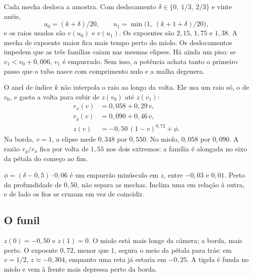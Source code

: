 \documentclass[11pt,a4paper]{article}
\begin{document}
Cada mecha desloca a amostra. Com deslocamento \(\delta \in \{0,\ 1/3,\ 2/3\}\) e vinte anéis,
\[
  u_0 = (k + \delta)/20, \qquad u_1 = \min\big(1,\ (k + 1 + \delta)/20\big),
\]
e os raios usados são \(v(u_0)\) e \(v(u_1)\). Os expoentes são \(2{,}15\), \(1{,}75\) e \(1{,}38\). A mecha de expoente maior fica mais tempo perto do miolo. Os deslocamentos impedem que as três famílias caiam nas mesmas elipses. Há ainda um piso: se \(v_1 < v_0 + 0{,}006\), \(v_1\) é empurrado. Sem isso, a potência achata tanto o primeiro passo que o tubo nasce com comprimento nulo e a malha degenera.

O anel de índice \(k\) não interpola o raio ao longo da volta. Ele usa um raio só, o de \(v_0\), e gasta a volta para subir de \(z(v_0)\) até \(z(v_1)\):
\begin{equation}
\begin{aligned}
r_x(v) &= 0{,}058 + 0{,}29\, v,\\
r_y(v) &= 0{,}090 + 0{,}46\, v,\\
z(v) &= -0{,}50\,(1 - v)^{0{,}72} + \phi .
\end{aligned}
\label{eq:raio}
\end{equation}
Na borda, \(v = 1\), a elipse mede \(0{,}348\) por \(0{,}550\). No miolo, \(0{,}058\) por \(0{,}090\). A razão \(r_y/r_x\) fica por volta de \(1{,}55\) nos dois extremos: a família é alongada no eixo da pétala do começo ao fim.

\(\phi = (\delta - 0{,}5)\cdot 0{,}06\) é um empurrão minúsculo em \(z\), entre \(-0{,}03\) e \(0{,}01\). Perto da profundidade de \(0{,}50\), não separa as mechas. Inclina uma em relação à outra, e de lado os fios se cruzam em vez de coincidir.

\subsection{O funil}

\(z(0) = -0{,}50\) e \(z(1) = 0\). O miolo está mais longe da câmera; a borda, mais perto. O expoente \(0{,}72\), menor que \(1\), segura o meio da pétala para trás: em \(v = 1/2\), \(z \approx -0{,}304\), enquanto uma reta já estaria em \(-0{,}25\). A tigela é funda no miolo e vem à frente mais depressa perto da borda.
\end{document}
